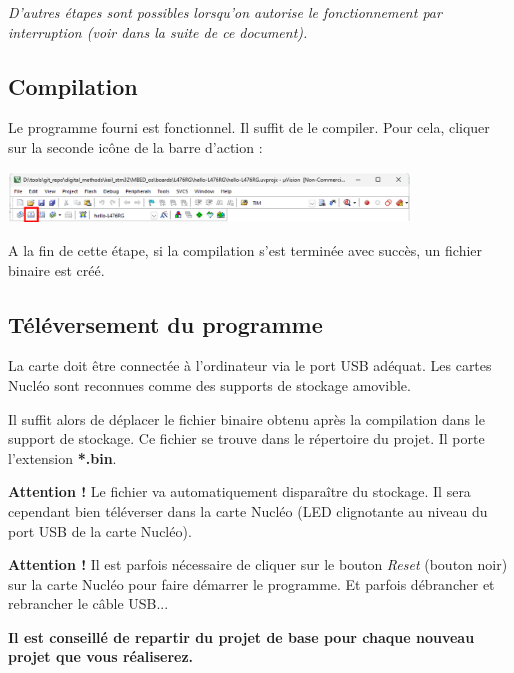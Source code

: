 \documentclass[a4paper,11pt,titlepage]{article} %
\begin{document}
\textit{D'autres étapes sont possibles lorsqu'on autorise le fonctionnement par interruption (voir dans la suite de ce document).}


\subsection{Compilation}

Le programme fourni est fonctionnel. Il suffit de le compiler. Pour cela, cliquer sur la seconde icône de la barre d'action :

\begin{center}
	\includegraphics[width=0.8\textwidth]{images/uvision_compile.png}
\end{center}

A la fin de cette étape, si la compilation s'est terminée avec succès, un fichier binaire est créé.


\subsection{Téléversement du programme}

La carte doit être connectée à l'ordinateur via le port USB adéquat. Les cartes Nucléo sont reconnues comme des supports de stockage amovible.

Il suffit alors de déplacer le fichier binaire obtenu après la compilation dans le support de stockage. Ce fichier se trouve dans le répertoire du projet. Il porte l'extension \textbf{*.bin}.

\bigskip

\textbf{Attention !} Le fichier va automatiquement disparaître du stockage. Il sera cependant bien téléverser dans la carte Nucléo (LED clignotante au niveau du port USB de la carte Nucléo).

\bigskip

\textbf{Attention !} Il est parfois nécessaire de cliquer sur le bouton \textit{Reset} (bouton noir) sur la carte Nucléo pour faire démarrer le programme. Et parfois débrancher et rebrancher le câble USB...


\bigskip

\textbf{Il est conseillé de repartir du projet de base pour chaque nouveau projet que vous réaliserez.}


\cleardoublepage
\end{document}
